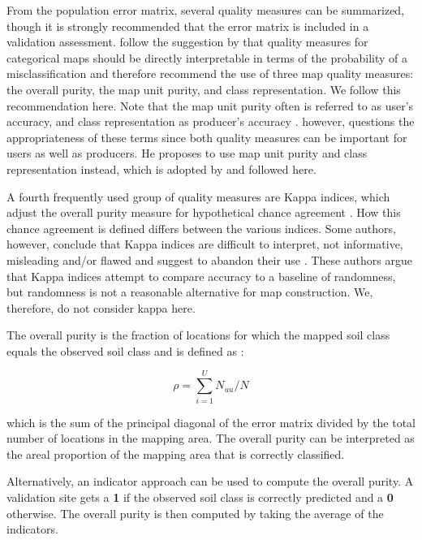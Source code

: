 \documentclass[10pt,b5paper,]{book}
\theoremstyle{definition}
\theoremstyle{definition}
\theoremstyle{definition}
\theoremstyle{remark}
\begin{document}
From the population error matrix, several quality measures can be
summarized, though it is strongly recommended that the error matrix is
included in a validation assessment. \citet{brus2011sampling} follow the
suggestion by \citet{stehman1997selecting} that quality measures for
categorical maps should be directly interpretable in terms of the
probability of a misclassification and therefore recommend the use of
three map quality measures: the overall purity, the map unit purity, and
class representation. We follow this recommendation here. Note that the
map unit purity often is referred to as user's accuracy, and class
representation as producer's accuracy
\citep{stehman1997selecting, adhikari2014constructing}.
\citet{lark1995components} however, questions the appropriateness of
these terms since both quality measures can be important for users as
well as producers. He proposes to use map unit purity and class
representation instead, which is adopted by \citet{brus2011sampling} and
followed here.

A fourth frequently used group of quality measures are Kappa indices,
which adjust the overall purity measure for hypothetical chance
agreement \citep{stehman1997selecting}. How this chance agreement is
defined differs between the various indices. Some authors, however,
conclude that Kappa indices are difficult to interpret, not informative,
misleading and/or flawed and suggest to abandon their use
\citep{pontius2011death}. These authors argue that Kappa indices attempt
to compare accuracy to a baseline of randomness, but randomness is not a
reasonable alternative for map construction. We, therefore, do not
consider kappa here.

The overall purity is the fraction of locations for which the mapped
soil class equals the observed soil class and is defined as
\citep{brus2011sampling}:

\begin{equation}
\rho = \sum_{i=1}^{U} N_{uu} / N
\end{equation}

which is the sum of the principal diagonal of the error matrix divided
by the total number of locations in the mapping area. The overall purity
can be interpreted as the areal proportion of the mapping area that is
correctly classified.

Alternatively, an indicator approach can be used to compute the overall
purity. A validation site gets a \textbf{1} if the observed soil class
is correctly predicted and a \textbf{0} otherwise. The overall purity is
then computed by taking the average of the indicators.
\end{document}
